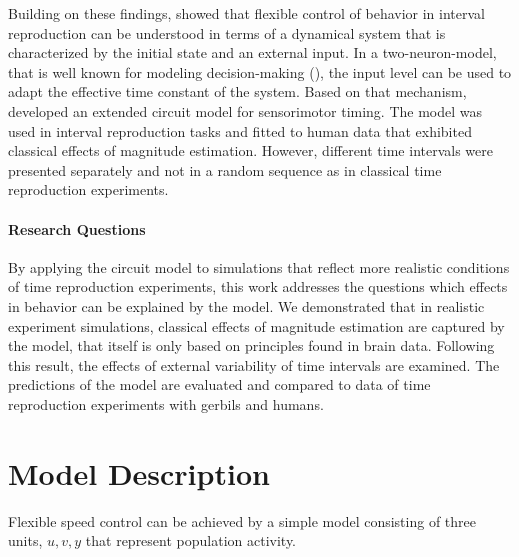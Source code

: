 \documentclass[10pt]{article}
\begin{document}

Building on these findings, \cite{Remington2018} showed that flexible control of behavior in interval reproduction can be understood in terms of a dynamical system that is characterized by the initial state and an external input.
 In a two-neuron-model, that is well known for modeling decision-making (\cite{Roxin2008}), the input level can be used to adapt the effective time constant of the system.
Based on that mechanism, \cite{Egger2020} developed an extended circuit model for sensorimotor timing.
The model was used in interval reproduction tasks and fitted to human data that exhibited classical effects of magnitude estimation. 
However, different time intervals were presented separately and not in a random sequence as in classical time reproduction experiments. 


\paragraph{Research Questions}
By applying the circuit model to simulations that reflect more realistic conditions of time reproduction experiments, this work addresses the questions which effects in behavior can be explained by the model. 
We demonstrated that in realistic experiment simulations, classical effects of magnitude estimation are captured by the model, that itself is only based on principles found in brain data.
Following this result, the effects of external variability of time intervals are examined. The predictions of the model are evaluated and compared to data of time reproduction experiments with gerbils and humans.


\section{Model Description}
Flexible speed control can be achieved by a simple model consisting of three units, $u, v, y$ that represent population activity. 
\end{document}
